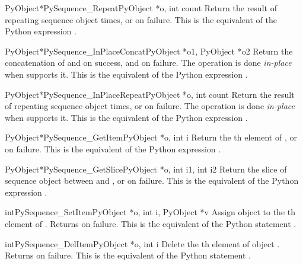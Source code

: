 \documentclass{manual}
\begin{document}
\begin{cfuncdesc}{PyObject*}{PySequence_Repeat}{PyObject *o, int count}
Return the result of repeating sequence object
  times, or \NULL{} on failure.  This is the
equivalent of the Python expression .
\end{cfuncdesc}

\begin{cfuncdesc}{PyObject*}{PySequence_InPlaceConcat}{PyObject *o1, PyObject *o2}
Return the concatenation of  and  on success, and \NULL{} on
failure.  The operation is done \emph{in-place} when  supports it. 
This is the equivalent of the Python expression .
\end{cfuncdesc}


\begin{cfuncdesc}{PyObject*}{PySequence_InPlaceRepeat}{PyObject *o, int count}
Return the result of repeating sequence object   times, or
\NULL{} on failure.  The operation is done \emph{in-place} when 
supports it.  This is the equivalent of the Python expression .
\end{cfuncdesc}


\begin{cfuncdesc}{PyObject*}{PySequence_GetItem}{PyObject *o, int i}
Return the th element of , or \NULL{} on failure. This
is the equivalent of the Python expression .
\end{cfuncdesc}


\begin{cfuncdesc}{PyObject*}{PySequence_GetSlice}{PyObject *o, int i1, int i2}
Return the slice of sequence object  between  and
, or \NULL{} on failure. This is the equivalent of the Python
expression .
\end{cfuncdesc}


\begin{cfuncdesc}{int}{PySequence_SetItem}{PyObject *o, int i, PyObject *v}
Assign object  to the th element of .
Returns  on failure.  This is the equivalent of the Python
statement .
\end{cfuncdesc}

\begin{cfuncdesc}{int}{PySequence_DelItem}{PyObject *o, int i}
Delete the th element of object .  Returns
 on failure.  This is the equivalent of the Python
statement .
\end{cfuncdesc}
\end{document}
